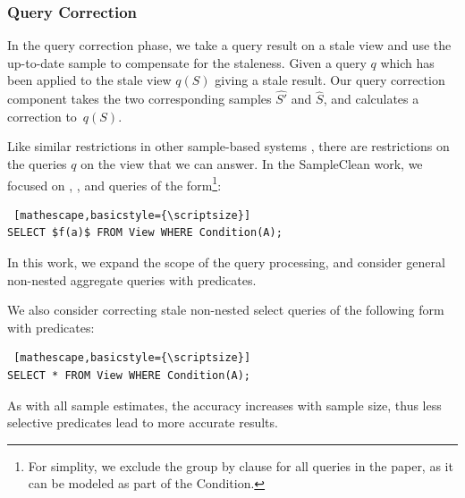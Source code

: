 \subsubsection{Query Correction}
In the query correction phase, we take a query result on a stale view and use the up-to-date sample to compensate for the staleness.
Given a query $q$ which has been applied to the stale view $q(S)$ giving a stale result.
Our query correction component takes the two corresponding samples $\hat{S'}$ and $\hat{S}$, and calculates a correction to~$q(S)$.

Like similar restrictions in other sample-based systems \cite{agarwalknowing}, there are restrictions on the queries $q$ on the view that we can answer. 
In the SampleClean work, we focused on \sumfunc, \countfunc, and \avgfunc queries of the form\footnote{\scriptsize For simplity, we exclude the group by clause for all queries in the paper, as it can be modeled as part of the \textsf{Condition}.}: 
\begin{lstlisting} [mathescape,basicstyle={\scriptsize}]
SELECT $f(a)$ FROM View WHERE Condition(A);
\end{lstlisting}
In this work, we expand the scope of the query processing, and consider general non-nested aggregate queries with predicates.

We also consider correcting stale non-nested select queries of the following form with predicates:
\begin{lstlisting} [mathescape,basicstyle={\scriptsize}]
SELECT * FROM View WHERE Condition(A);
\end{lstlisting}
As with all sample estimates, the accuracy increases with sample size, thus less selective predicates lead to more accurate results.

